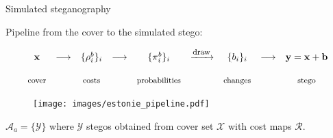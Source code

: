 \documentclass[10pt]{beamer}
\begin{document}
\begin{frame}{Simulated steganography}

Pipeline from the cover to the simulated stego:

\begin{equation*}
\begin{array}{ccccccccc}
    \mathbf{x} & \longrightarrow & \{\rho^b_i\}_i & \longrightarrow & \{\pi_i^b\}_i &   \xrightarrow{\mbox{\footnotesize{draw}}} & \{b_i\}_i &  \longrightarrow & \mathbf{y} = \mathbf{x} + \mathbf{b} \\ \\
    \mbox{\footnotesize{cover}} & & \mbox{\footnotesize{costs}} & & \mbox{\footnotesize{probabilities}} & & \mbox{\footnotesize{changes}} & &  \mbox{\footnotesize{stego}}
    
\end{array}
\end{equation*}

\pause 

\begin{figure}[h]
\centerline{\texttt{[image: images/estonie\_pipeline.pdf]}}
\end{figure}

\pause


$\mathcal{A}_a = \{\mathcal{Y}\}$ where $\mathcal{Y}$ stegos obtained from cover set $\mathcal{X}$ with cost maps $\mathcal{R}$.

\end{frame}




    
\end{document}
